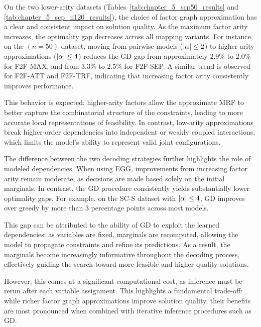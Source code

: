 On the two lower-arity datasets (Tables~\ref{tab:chapter_5_scp50_results} and \ref{tab:chapter_5_scp_n120_results}), the choice of factor graph approximation has a clear and consistent impact on solution quality. As the maximum factor arity increases, the optimality gap decreases across all mapping variants. For instance, on the $(n=50)$ dataset, moving from pairwise models ($|\alpha| \leq 2$) to higher-arity approximations ($|\alpha| \leq 4$) reduces the GD gap from approximately $2.9\%$ to $2.0\%$ for F2F-MAX, and from $3.3\%$ to $2.5\%$ for F2F-SEP. A similar trend is observed for F2F-ATT and F2F-TRF, indicating that increasing factor arity consistently improves performance.

This behavior is expected: higher-arity factors allow the approximate MRF to better capture the combinatorial structure of the constraints, leading to more accurate local representations of feasibility. In contrast, low-arity approximations break higher-order dependencies into independent or weakly coupled interactions, which limits the model’s ability to represent valid joint configurations.

The difference between the two decoding strategies further highlights the role of modeled dependencies. When using EGG, improvements from increasing factor arity remain moderate, as decisions are made based solely on the initial marginals. In contrast, the GD procedure consistently yields substantially lower optimality gaps. For example, on the SC-S dataset with $|\alpha| \leq 4$, GD improves over greedy by more than $3$ percentage points across most models.

This gap can be attributed to the ability of GD to exploit the learned dependencies: as variables are fixed, marginals are recomputed, allowing the model to propagate constraints and refine its predictions. As a result, the marginals become increasingly informative throughout the decoding process, effectively guiding the search toward more feasible and higher-quality solutions.

However, this comes at a significant computational cost, as inference must be rerun after each variable assignment. This highlights a fundamental trade-off: while richer factor graph approximations improve solution quality, their benefits are most pronounced when combined with iterative inference procedures such as GD.

